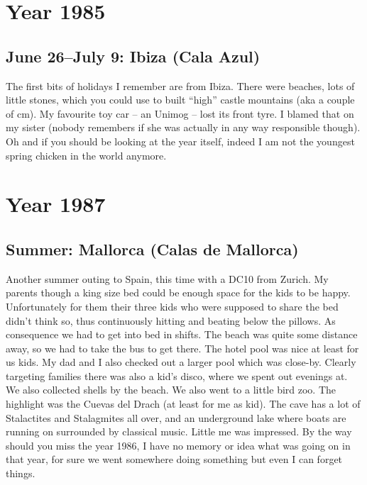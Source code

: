 \chapter{Year 1985}
\label{1985}

\section{June 26--July 9: Ibiza (Cala Azul)}
\label{1985:Ibiza}

The first bits of holidays I remember are from Ibiza. There were beaches, lots of little stones, which you could use to built ``high'' castle mountains (aka a couple of cm). My favourite toy car -- an Unimog -- lost its front tyre. I blamed that on my sister (nobody remembers if she was actually in any way responsible though). Oh and if you should be looking at the year itself, indeed I am not the youngest spring chicken in the world anymore.

\chapter{Year 1987}
\label{1987}

\section{Summer: Mallorca (Calas de Mallorca)}
\label{1987:Mallorca}

Another summer outing to Spain, this time with a DC10 from Zurich. My parents though a king size bed could be enough space for the kids to be happy. Unfortunately for them their three kids who were supposed to share the bed didn't think so, thus continuously hitting and beating below the pillows. As consequence we had to get into bed in shifts. The beach was quite some distance away, so we had to take the bus to get there. The hotel pool was nice at least for us kids. My dad and I also checked out a larger pool which was close-by. Clearly targeting families there was also a kid's disco, where we spent out evenings at. We also collected shells by the beach. We also went to a little bird zoo. The highlight was the Cuevas del Drach (at least for me as kid). The cave has a lot of Stalactites and Stalagmites all over, and an underground lake where boats are running on surrounded by classical music. Little me was impressed. By the way should you miss the year 1986, I have no memory or idea what was going on in that year, for sure we went somewhere doing something but even I can forget things.

